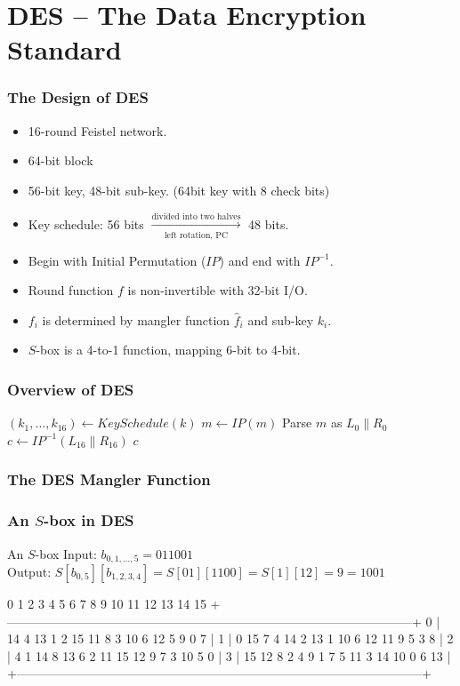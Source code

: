 \section{DES -- The Data Encryption Standard}
\begin{frame}\frametitle{The Design of DES}
\begin{itemize}
\item 16-round Feistel network.
\item 64-bit block
\item 56-bit key, 48-bit sub-key. (64bit key with 8 check bits)
\item Key schedule: 56 bits $\xrightarrow[\text{left rotation, PC}]{\text{divided into two halves}}$ 48 bits.
\item Begin with Initial Permutation ($IP$) and end with $IP^{-1}$.
\item Round function $f$ is non-invertible with 32-bit I/O.
\item $f_i$ is determined by mangler function $\hat{f}_i$ and sub-key $k_i$.
\item $S$-box is a 4-to-1 function, mapping 6-bit to 4-bit.
\end{itemize}
\end{frame}
\begin{frame}\frametitle{Overview of DES}
\begin{algorithm}[H]
\DontPrintSemicolon
\caption{$\mathsf{DES}$}
\BlankLine
$(k_{1},\dots,k_{16}) \gets KeySchedule(k)$\;
$m \gets IP(m)$\;
Parse $m$ as $L_{0}\| R_{0}$\;
$c \gets IP^{-1}(L_{16}\| R_{16})$\;
\Return $c$\;
\end{algorithm}
\end{frame}
\begin{frame}\frametitle{The DES Mangler Function}
\begin{figure}
\begin{center}

\end{center}
\end{figure}
\end{frame}
\begin{frame}[fragile]\frametitle{An $S$-box in DES}
\begin{exampleblock}{An $S$-box}	
Input: $b_{0,1,...,5}=011001$\\
Output: $S[b_{0,5}][b_{1,2,3,4}]=S[01][1100]=S[1][12]=9=1001$
\begin{semiverbatim}
     0  1  2  3  4  5  6  7  8  9 10 11 12 13 14 15
  +--------------------------------------------------------------------------------------------------+
0 | 14  4 13  1  2 15 11  8  3 10  6 12  5  9  0  7 |
1 |  0 15  7  4 14  2 13  1 10  6 12 11  \alert{9}  5  3  8 |
2 |  4  1 14  8 13  6  2 11 15 12  9  7  3 10  5  0 |
3 | 15 12  8  2  4  9  1  7  5 11  3 14 10  0  6 13 |
  +--------------------------------------------------------------------------------------------------+
\end{semiverbatim}
\end{exampleblock}
\end{frame}
